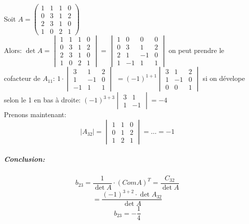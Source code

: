 \begin{exemple}

    Soit $A = \begin{pmatrix}
        1 & 1 & 1 & 0\\
        0 & 3 & 1 & 2\\
        2 & 3 & 1 & 0 \\
        1 & 0 & 2 & 1
    \end{pmatrix}$
\\
Alors: $\det A = \begin{vmatrix}
        1 & 1 & 1 & 0\\
        0 & 3 & 1 & 2\\
        2 & 3 & 1 & 0 \\
        1 & 0 & 2 & 1
\end{vmatrix}$ = $\begin{vmatrix}
        1 & 0 & 0 & 0\\
        0 & 3 & 1 & 2\\
        2 & 1 & -1 & 0 \\
        1 & -1 & 1 & 1
        \end{vmatrix}$ \hspace{0.4cm} on peut prendre le cofacteur de $A_{11}$: 
        $1\cdot \begin{vmatrix}
        3 & 1 & 2\\
        1 & -1 & 0 \\
        -1 & 1 & 1
        \end{vmatrix}$
        $=(-1)^{1+1} \begin{vmatrix}
            3 & 1 & 2 \\
            1 & -1 & 0 \\
            0 & 0 & 1
        \end{vmatrix}$ si on dévelope selon le 1 en bas à droite:
        $  (-1)^{3+3} \begin{vmatrix}
            3 & 1 \\
            1 & -1
        \end{vmatrix} = -4$
        \\
        Prenons maintenant:
        \[|A_{32}| = \begin{vmatrix}
            1 & 1 & 0 \\
            0 & 1 & 2\\
            1 & 2 & 1
        \end{vmatrix} = \dots = -1\]
        \subparagraph{Conclusion:} 
        \[b_{23} = \frac{1}{\det A}\cdot(ComA)^T = \frac{C_{32}}{\det A}\]
        \[= \frac{(-1)^{3+2}\cdot \det A_{32}}{\det A}\]
        \[b_{23} = -\frac{1}{4}\]
\end{exemple}
